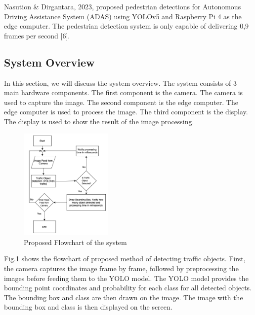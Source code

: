 \documentclass[conference]{IEEEtran}
\begin{document}
Nasution \& Dirgantara, 2023, proposed pedestrian detections for Autonomous Driving Assistance System (ADAS) using YOLOv5 and Raspberry Pi 4 as the edge computer. The pedestrian detection system is only capable of delivering 0,9 frames per second [6].

\subsection{System Overview}
In this section, we will discuss the system overview. The system consists of 3 main hardware components. 
The first component is the camera. The camera is used to capture the image.
The second component is the edge computer. The edge computer is used to process the image. 
The third component is the display. The display is used to show the result of the image processing.
\begin{figure}[!ht]
\centering
\includegraphics[width=0.4\textwidth,keepaspectratio]{Proposed Flowchart.png}
\caption{Proposed Flowchart of the system}
\label{fig:flowchart}
\end{figure}


Fig.\ref{fig:flowchart} shows the flowchart of proposed method of detecting traffic objects. First, the camera captures the image frame by frame, followed by preprocessing the images before feeding them to the YOLO model. The YOLO model provides the bounding point coordinates and probability for each class for all detected objects. The bounding box and class are then drawn on the image. The image with the bounding box and class is then displayed on the screen.
\end{document}
